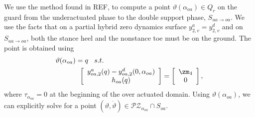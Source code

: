  We use the method found in REF, to compute a point $\vartheta(\alpha_{oa}) \in Q_{r}$ on the guard from the underactuated phase to the double support phase, $S_{ua \to oa}$. We use the facts that on a partial hybrid zero dynamics surface $y^{a}_{2,v} = y^{d}_{2,v}$ and on $S_{ua \to oa}$, both the stance heel and the nonstance toe must be on the ground. The point is obtained using
\begin{eqnarray}
\label{eq:inverse}
\vartheta(\alpha_{oa}) = q \hspace{3mm} s.t. \hspace{5cm} \nonumber\\
\left[ \begin{array}{c}
y^{a}_{oa,2}(q) - y^{d}_{oa,2} (0,\alpha_{oa}) \\
h_{oa}(q)
\end{array}
\right] =
\left[ \begin{array}{c}
\zm_4 \\
0
\end{array}
\right],
\end{eqnarray}
where $\tau_{\alpha_{oa}} = 0$ at the beginning of the over actuated domain. Using $\vartheta(\alpha_{oa})$, we can explicitly solve for a point $(\vartheta, \dot{\vartheta}) \in \mathcal{PZ}_{\alpha_{oa}} \cap S_{oa}$.


